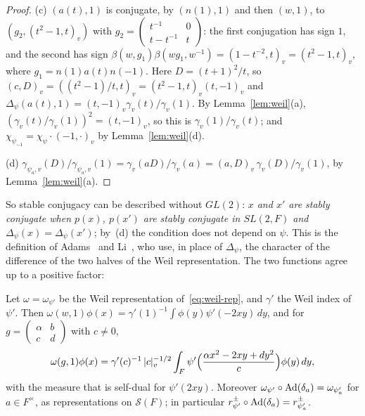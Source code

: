 \begin{proof}
(c) $(a(t),1)$ is conjugate, by $(n(1),1)$ and then $(w,1)$, to
$(g_2,(t^2-1,t)_v)$ with $g_2=\begin{pmatrix}t^{-1}&0\\t-t^{-1}&t
\end{pmatrix}$: the first conjugation has sign $1$, and the second has
sign $\beta(w,g_1)\beta(wg_1,w^{-1})=(1-t^{-2},t)_v=(t^2-1,t)_v$, where
$g_1=n(1)a(t)n(-1)$. Here
$D=(t+1)^2/t$, so $(c,D)_v=((t^2-1)/t,t)_v=(t^2-1,t)_v(t,-1)_v$ and
$\Delta_\psi(a(t),1)=(t,-1)_v\gamma_v(t)/\gamma_v(1)$. By
Lemma~\ref{lem:weil}(a), $(\gamma_v(t)/\gamma_v(1))^2=(t,-1)_v$, so this
is $\gamma_v(1)/\gamma_v(t)$; and $\chi_{\psi_{-1}}=\chi_\psi\cdot
(-1,\cdot)_v$ by Lemma~\ref{lem:weil}(d).

(d) $\gamma_{\psi_a,v}(D)/\gamma_{\psi_a,v}(1)=\gamma_v(aD)/\gamma_v(a)=
(a,D)_v\,\gamma_v(D)/\gamma_v(1)$, by Lemma~\ref{lem:weil}(a).
\end{proof}

So stable conjugacy can be described without $GL(2)$: \emph{$x$ and $x'$
are stably conjugate when $p(x)$, $p(x')$ are stably conjugate in
$SL(2,F)$ and $\Delta_\psi(x)=\Delta_\psi(x')$}; by~(d) the condition does
not depend on $\psi$. This is the definition of Adams~\cite{Ad98} and
Li~\cite[\S5]{Li11}, who use, in place of $\Delta_\psi$, the character of
the difference of the two halves of the Weil representation. The two
functions agree up to a positive factor:

\begin{lemma}\label{lem:weil-kernel}
Let $\omega=\omega_{\psi'}$ be the Weil representation
of~\eqref{eq:weil-rep}, and $\gamma'$ the Weil index of $\psi'$. Then
$\omega(w,1)\phi(x)=\gamma'(1)^{-1}\int\phi(y)\psi'(-2xy)\,dy$, and for
$g=\begin{pmatrix}\alpha&b\\c&d\end{pmatrix}$ with $c\ne0$,
\begin{equation}\label{eq:weil-kernel}
\omega(g,1)\phi(x)=\gamma'(c)^{-1}\,|c|_v^{-1/2}\int_{F}\psi'\Bigl(
\frac{\alpha x^2-2xy+dy^2}{c}\Bigr)\phi(y)\,dy,
\end{equation}
with the measure that is self-dual for $\psi'(2xy)$. Moreover
$\omega_{\psi'}\circ\operatorname{Ad}(\delta_a)=\omega_{\psi'_a}$ for $a\in
F^\times$, as representations on $\mathcal S(F)$; in particular
$r^\pm_{\psi'}\circ\operatorname{Ad}(\delta_a)=r^\pm_{\psi'_a}$.
\end{lemma}

